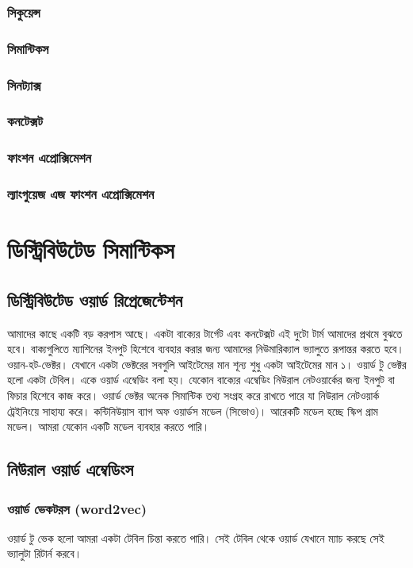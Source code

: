 \documentclass{book}
\begin{document}
\subsection{সিকুয়েন্স} 
\subsection{সিমান্টিকস} 
\subsection{সিনট্যাক্স}
\subsection{কনটেক্সট}
\subsection{ফাংশন এপ্রোক্সিমেশন}
\subsection{ল্যাংগুয়েজ এজ ফাংশন এপ্রোক্সিমেশন} 
 
 
\chapter{ডিস্ট্রিবিউটেড সিমান্টিকস}
\section{ডিস্ট্রিবিউটেড ওয়ার্ড রিপ্রেজেন্টেশন}
আমাদের কাছে একটি বড় করপাস আছে। একটা বাক্যের টার্গেট এবং কনটেক্সট এই দুটো টার্ম আমাদের প্রথমে বুঝতে হবে। 
বাক্যগুলিতে  ম্যাশিনের ইনপুট হিশেবে ব্যবহার করার জন্য আমাদের নিউমারিক্যাল ভ্যালুতে রূপান্তর করতে হবে। 
ওয়ান-হট-ভেক্টর। যেখানে একটা ভেক্টরের সবগুলি আইটেমের মান শূন্য শুধু একটা আইটেমের মান ১। ওয়ার্ড টু ভেক্টর হলো একটা টেবিল। 
একে ওয়ার্ড এম্বেডিং বলা হয়। যেকোন বাক্যের এম্বেডিং নিউরাল নেটওয়ার্কের জন্য ইনপুট বা ফিচার হিশেবে কাজ করে।
ওয়ার্ড ভেক্টর অনেক সিমান্টিক তথ্য সংগ্রহ করে রাখতে পারে যা নিউরাল নেটওয়ার্ক ট্রেইনিংয়ে সাহায্য করে।
কন্টিনিউয়াস ব্যাগ অফ ওয়ার্ডস মডেল (সিভোও)। আরেকটি মডেল হচ্ছে স্কিপ গ্রাম মডেল। আমরা যেকোন একটি মডেল ব্যবহার করতে পারি। 
 
\section{নিউরাল ওয়ার্ড এম্বেডিংস}
\subsection{ওয়ার্ড ভেকটরস (word2vec) }
ওয়ার্ড টু ভেক হলো আমরা একটা টেবিল চিন্তা করতে পারি। সেই টেবিল থেকে ওয়ার্ড যেখানে ম্যাচ করছে সেই ভ্যালুটা রিটার্ন করবে। 
\end{document}
